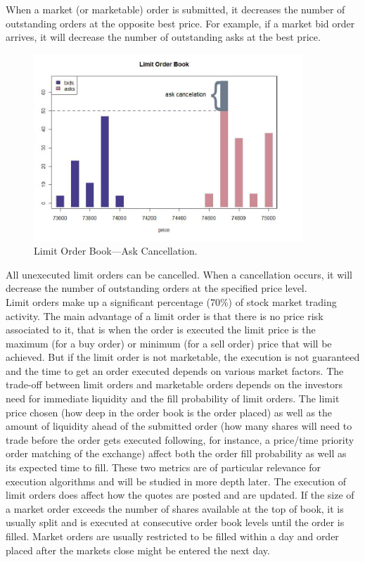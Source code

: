 When a market (or marketable) order is submitted, it decreases the number of outstanding orders at the opposite best price. For example, if a market bid order arrives, it will decrease the number of outstanding asks at the best price.
	\begin{figure}[!ht]
	   \centering
	   \includegraphics[width=0.9\textwidth]{chapters/chapter_trading_fund/figures/limitbk3.png} 
	   \caption{Limit Order Book---Ask Cancellation. \label{fig:limbk3}}
	\end{figure}
All unexecuted limit orders can be cancelled. When a cancellation occurs, it will decrease the number of outstanding orders at the specified price level. \\


Limit orders make up a significant percentage (70\%) of stock market trading activity. The main advantage of a limit order is that there is no price risk associated to it, that is when the order is executed the limit price is the maximum (for a buy order) or minimum (for a sell order) price that will be achieved. But if the limit order is not marketable, the execution is not guaranteed and the time to get an order executed depends on various market factors. The trade-off between limit orders and marketable orders depends on the investors need for immediate liquidity and the fill probability of limit orders. The limit price chosen (how deep in the order book is the order placed) as well as the amount of liquidity ahead of the submitted order (how many shares will need to trade before the order gets executed following, for instance, a price/time priority order matching of the exchange) affect both the order fill probability as well as its expected time to fill. These two metrics are of particular relevance for execution algorithms and will be studied in more depth later. The execution of limit orders does affect how the quotes are posted and are updated. If the size of a market order exceeds the number of shares available at the top of book, it is usually split and is executed at consecutive order book levels until the order is filled. Market orders are usually restricted to be filled within a day and order placed after the markets close might be entered the next day. 


